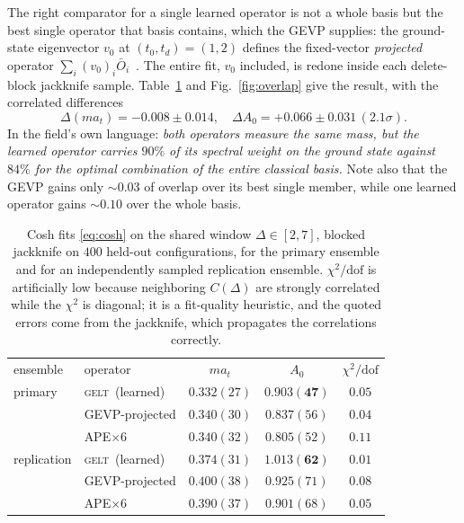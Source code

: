 \documentclass[aps,prl,reprint,superscriptaddress,nofootinbib]{revtex4-2}
\newcommand{\Obar}{\bar{O}}
\newcommand{\at}{a_t}
\newcommand{\GELT}{\textsc{gelt}}
\begin{document}
The right comparator for a single learned operator is not a whole basis but the
best single operator that basis contains, which the GEVP supplies: the
ground-state eigenvector $v_0$ at $(t_0,t_d)=(1,2)$ defines the fixed-vector
\emph{projected} operator $\sum_i(v_0)_i\Obar_i$~\cite{Blossier2009}. The entire
fit, $v_0$ included, is redone inside each delete-block jackknife sample.
Table~\ref{tab:overlap} and Fig.~\ref{fig:overlap} give the result, with the
correlated differences
\begin{equation}
  \Delta(m\at)=-0.008\pm0.014,\quad
  \Delta A_0=+0.066\pm0.031\,(2.1\sigma).
\end{equation}
In the field's own language: \emph{both operators measure the same mass, but the
learned operator carries $90\%$ of its spectral weight on the ground state
against $84\%$ for the optimal combination of the entire classical basis.} Note
also that the GEVP gains only $\sim0.03$ of overlap over its best single member,
while one learned operator gains $\sim0.10$ over the whole basis.

\begin{table}[t]
\caption{Cosh fits \eqref{eq:cosh} on the shared window $\Delta\in[2,7]$,
blocked jackknife on $400$ held-out configurations, for the primary ensemble and
for an independently sampled replication ensemble. $\chi^2/\mathrm{dof}$ is
artificially low because neighboring $C(\Delta)$ are strongly correlated while
the $\chi^2$ is diagonal; it is a fit-quality heuristic, and the quoted errors
come from the jackknife, which propagates the correlations correctly.}
\label{tab:overlap}
\begin{ruledtabular}
\begin{tabular}{llccc}
ensemble & operator & $m\at$ & $A_0$ & $\chi^2/\mathrm{dof}$\\
\colrule
primary & \GELT\ (learned) & $0.332(27)$ & $\bm{0.903(47)}$ & $0.05$\\
        & GEVP-projected   & $0.340(30)$ & $0.837(56)$ & $0.04$\\
        & APE$\times6$     & $0.340(32)$ & $0.805(52)$ & $0.11$\\
\colrule
replication & \GELT\ (learned) & $0.374(31)$ & $\bm{1.013(62)}$ & $0.01$\\
            & GEVP-projected   & $0.400(38)$ & $0.925(71)$ & $0.08$\\
            & APE$\times6$     & $0.390(37)$ & $0.901(68)$ & $0.05$\\
\end{tabular}
\end{ruledtabular}
\end{table}
\end{document}
